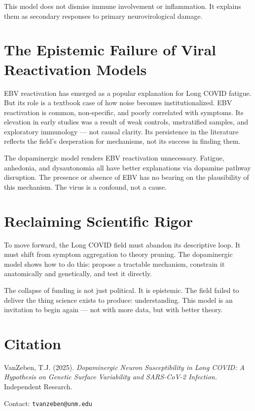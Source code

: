 \documentclass[12pt]{article}
\begin{document}
This model does not dismiss immune involvement or inflammation. It explains them as secondary responses to primary neurovirological damage.

\section*{The Epistemic Failure of Viral Reactivation Models}

EBV reactivation has emerged as a popular explanation for Long COVID fatigue. But its role is a textbook case of how noise becomes institutionalized. EBV reactivation is common, non-specific, and poorly correlated with symptoms. Its elevation in early studies was a result of weak controls, unstratified samples, and exploratory immunology --- not causal clarity. Its persistence in the literature reflects the field's desperation for mechanisms, not its success in finding them.

The dopaminergic model renders EBV reactivation unnecessary. Fatigue, anhedonia, and dysautonomia all have better explanations via dopamine pathway disruption. The presence or absence of EBV has no bearing on the plausibility of this mechanism. The virus is a confound, not a cause.

\section*{Reclaiming Scientific Rigor}

To move forward, the Long COVID field must abandon its descriptive loop. It must shift from symptom aggregation to theory pruning. The dopaminergic model shows how to do this: propose a tractable mechanism, constrain it anatomically and genetically, and test it directly.

The collapse of funding is not just political. It is epistemic. The field failed to deliver the thing science exists to produce: understanding. This model is an invitation to begin again --- not with more data, but with better theory.

\section*{Citation}

VanZeben, T.J. (2025). \textit{Dopaminergic Neuron Susceptibility in Long COVID: A Hypothesis on Genetic Surface Variability and SARS-CoV-2 Infection.} Independent Research.

\bigskip
\noindent Contact: \texttt{tvanzeben@unm.edu}
\end{document}
